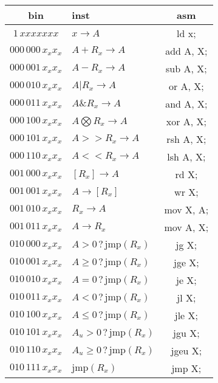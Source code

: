 \documentclass[11pt]{article}
\begin{document}
\begin{tabular}{c|l|c}
\textbf{bin} & \textbf{inst} & \textbf{asm}\\
\hline 
$1\,xxxxxxx$ & $x \rightarrow A$ & ld x;  \\
\hline
$000\,000\,x_x x_x$ & $A + R_x \rightarrow A$ & add A, X; \\
$000\,001\,x_x x_x$ & $A - R_x \rightarrow A$ & sub A, X; \\
$000\,010\,x_x x_x$ & $A | R_x \rightarrow A$ & or A, X; \\
$000\,011\, x_x x_x$ & $A \& R_x \rightarrow A$ & and A, X; \\
$000\,100\, x_x x_x$ & $A \bigotimes R_x \rightarrow A$ & xor A, X; \\
$000\,101\, x_x x_x$ & $A >> R_x \rightarrow A$ & rsh A, X; \\
$000\,110\, x_x x_x$ & $A << R_x \rightarrow A$ & lsh A, X; \\
\hline
$001\,000\, x_x x_x$ & $[R_x] \rightarrow A$ & rd X; \\
$001\,001\, x_x x_x$ & $A \rightarrow [R_x]$ & wr X; \\
$001\,010\, x_x x_x$ & $R_x \rightarrow A$ & mov X, A; \\
$001\,011\, x_x x_x$ & $A \rightarrow R_x$ & mov A, X; \\
\hline
$010\,000\, x_x x_x$ & $A > 0 \,?\, \mathrm{jmp}(R_x)$ & jg X; \\
$010\,001\, x_x x_x$ & $A \geq 0 \,?\, \mathrm{jmp}(R_x)$ & jge X; \\
$010\,010\, x_x x_x$ & $A = 0 \,?\, \mathrm{jmp}(R_x)$ & je X; \\
$010\,011\, x_x x_x$ & $A < 0 \,?\, \mathrm{jmp}(R_x)$ & jl X; \\
$010\,100\, x_x x_x$ & $A \leq 0 \,?\, \mathrm{jmp}(R_x)$ & jle X; \\
$010\,101\, x_x x_x$ & $A_u > 0 \,?\, \mathrm{jmp}(R_x)$ & jgu X; \\
$010\,110\, x_x x_x$ & $A_u \geq 0 \,?\, \mathrm{jmp}(R_x)$ & jgeu X; \\
$010\,111\, x_x x_x$ & $\mathrm{jmp}(R_x)$ & jmp X; \\
\end{tabular}
\end{document}
